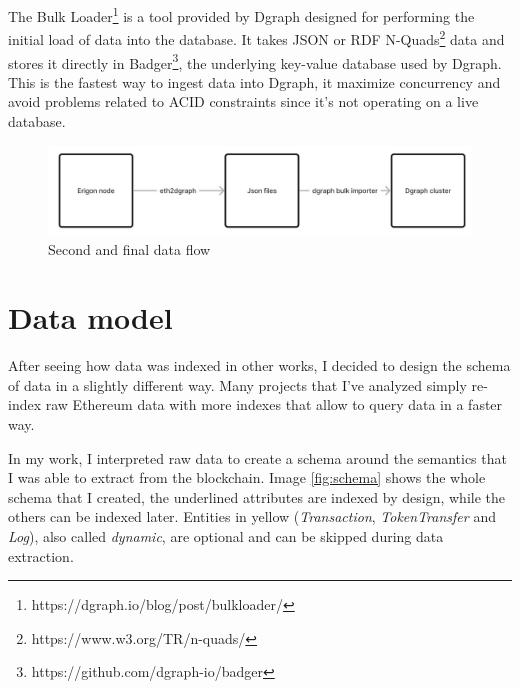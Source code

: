 The Bulk Loader\footnote{https://dgraph.io/blog/post/bulkloader/} is a tool provided by Dgraph designed for performing the initial load of data into the database. It takes JSON or RDF N-Quads\footnote{https://www.w3.org/TR/n-quads/} data and stores it directly in Badger\footnote{https://github.com/dgraph-io/badger}, the underlying key-value database used by Dgraph. This is the fastest way to ingest data into Dgraph, it maximize concurrency and avoid problems related to ACID constraints since it's not operating on a live database.

\begin{figure}[H]
  \centering
  \includegraphics[width=1\textwidth]{Figures/methods/data-flow-2.jpg}
  \caption[Second and final data flow]{Second and final data flow}
  \label{fig:data-flow-1}
\end{figure}

\section{Data model}

After seeing how data was indexed in other works, I decided to design the schema of data in a slightly different way. Many projects that I've analyzed simply re-index raw Ethereum data with more indexes that allow to query data in a faster way. 

In my work, I interpreted raw data to create a schema around the semantics that I was able to extract from the blockchain. Image \ref{fig:schema} shows the whole schema that I created, the underlined attributes are indexed by design, while the others can be indexed later. Entities in yellow (\textit{Transaction}, \textit{TokenTransfer} and \textit{Log}), also called \textit{dynamic}, are optional and can be skipped during data extraction.

